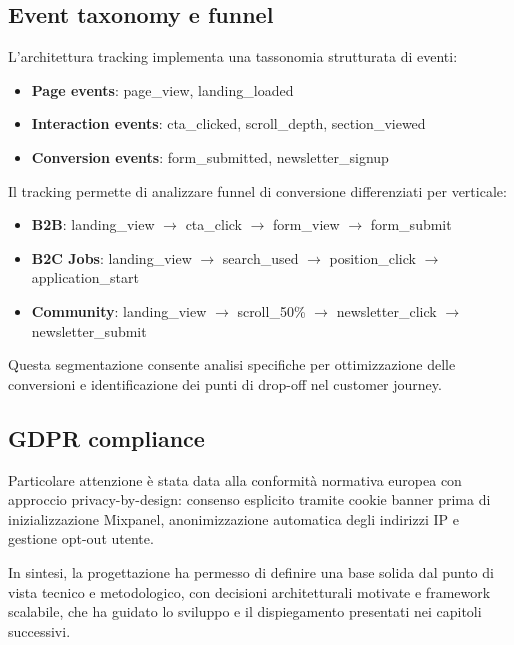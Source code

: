 \subsection{Event taxonomy e funnel}
L'architettura tracking implementa una tassonomia strutturata di eventi:
\begin{itemize}
  \item \textbf{Page events}: page\_view, landing\_loaded
  \item \textbf{Interaction events}: cta\_clicked, scroll\_depth, section\_viewed
  \item \textbf{Conversion events}: form\_submitted, newsletter\_signup
\end{itemize}

Il tracking permette di analizzare funnel di conversione differenziati per verticale:
\begin{itemize}
  \item \textbf{B2B}: landing\_view $\rightarrow$ cta\_click $\rightarrow$ form\_view $\rightarrow$ form\_submit
  \item \textbf{B2C Jobs}: landing\_view $\rightarrow$ search\_used $\rightarrow$ position\_click $\rightarrow$ application\_start
  \item \textbf{Community}: landing\_view $\rightarrow$ scroll\_50\% $\rightarrow$ newsletter\_click $\rightarrow$ newsletter\_submit
\end{itemize}

Questa segmentazione consente analisi specifiche per ottimizzazione delle 
conversioni e identificazione dei punti di drop-off nel customer journey.

\subsection{GDPR compliance}
Particolare attenzione è stata data alla conformità normativa europea con 
approccio privacy-by-design: consenso esplicito tramite cookie banner prima 
di inizializzazione Mixpanel, anonimizzazione automatica degli indirizzi IP 
e gestione opt-out utente.

\bigskip
In sintesi, la progettazione ha permesso di definire una base solida dal punto di
vista tecnico e metodologico, con decisioni architetturali motivate e framework 
scalabile, che ha guidato lo sviluppo e il dispiegamento presentati nei capitoli 
successivi.
